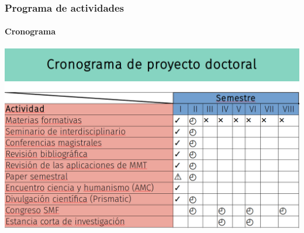 \documentclass{beamer}
\begin{document}
\begin{frame}
\frametitle{Programa de actividades}
\framesubtitle{Cronograma}

\includegraphics[width=\textwidth]{img/crono.png}

\end{frame}







% 
% 
\end{document}
